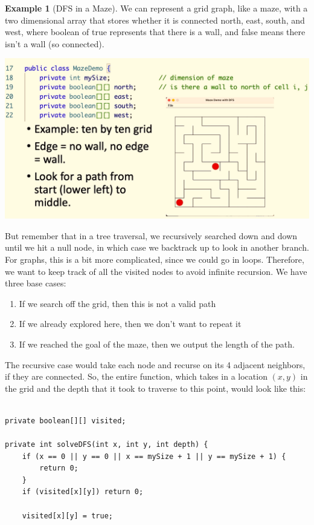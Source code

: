 \documentclass{article}
\theoremstyle{definition}
\newtheorem{example}{Example}[section]
\theoremstyle{remark}
\theoremstyle{definition}
\begin{document}
\begin{example}[DFS in a Maze]
We can represent a grid graph, like a maze, with a two dimensional array that stores whether it is connected north, east, south, and west, where boolean of true represents that there is a wall, and false means there isn't a wall (so connected). 
\begin{center}
    \includegraphics[scale=0.4]{img/grid_graph.png}
\end{center}
But remember that in a tree traversal, we recursively searched down and down until we hit a null node, in which case we backtrack up to look in another branch. For graphs, this is a bit more complicated, since we could go in loops. Therefore, we want to keep track of all the visited nodes to avoid infinite recursion. We have three base cases: 
\begin{enumerate}
    \item If we search off the grid, then this is not a valid path 
    \item If we already explored here, then we don't want to repeat it 
    \item If we reached the goal of the maze, then we output the length of the path. 
\end{enumerate}
The recursive case would take each node and recurse on its 4 adjacent neighbors, if they are connected. So, the entire function, which takes in a location $(x, y)$ in the grid and the depth that it took to traverse to this point, would look like this: 
\begin{verbatim}

private boolean[][] visited; 

private int solveDFS(int x, int y, int depth) {
    if (x == 0 || y == 0 || x == mySize + 1 || y == mySize + 1) {
        return 0; 
    }
    if (visited[x][y]) return 0; 
    
    visited[x][y] = true; 
    

\end{verbatim}
\end{example}
\end{document}
